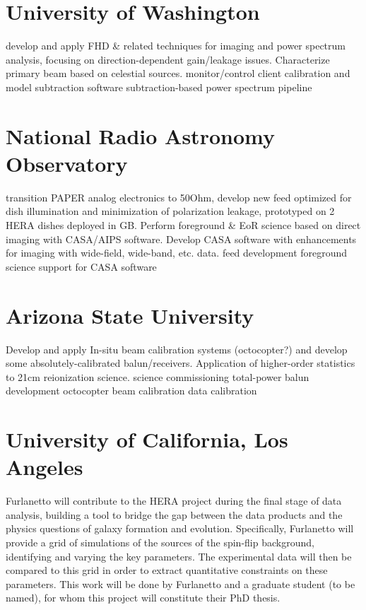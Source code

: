 \documentclass[preprint]{aastex}
\begin{document}
\section*{University of Washington}

develop and apply FHD \& related techniques for imaging and power spectrum
analysis, focusing on direction-dependent gain/leakage issues.  Characterize
primary beam based on celestial sources.  monitor/control client calibration
and model subtraction software subtraction-based power spectrum pipeline

\section*{National Radio Astronomy Observatory}

transition PAPER analog electronics to 50Ohm, develop new feed optimized for
dish illumination and minimization of polarization leakage, prototyped on 2
HERA dishes deployed in GB.  Perform foreground \& EoR science based on direct
imaging with CASA/AIPS software.  Develop CASA software with enhancements for
imaging with wide-field, wide-band, etc. data.  feed development foreground
science support for CASA software

\section*{Arizona State University}

Develop and apply In-situ beam calibration systems (octocopter?) and develop
some absolutely-calibrated balun/receivers.   Application of higher-order
statistics to 21cm reionization science.  science commissioning total-power
balun development octocopter beam calibration data calibration


\section*{University of California, Los Angeles}

Furlanetto will contribute to the HERA project during the final stage of data
analysis, building a tool to bridge the gap between the data products and the
physics questions of galaxy formation and evolution. Specifically, Furlanetto
will provide a grid of simulations of the sources of the spin-flip background,
identifying and varying the key parameters. The experimental data will then be
compared to this grid in order to extract quantitative constraints on these
parameters. This work will be done by Furlanetto and a graduate student (to be
named), for whom this project will constitute their PhD thesis.
\end{document}
